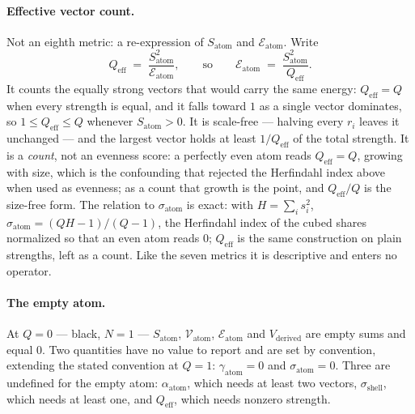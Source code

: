 \documentclass[12pt, a4paper]{article}
\begin{document}
\paragraph{Effective vector count.} Not an eighth metric: a
re-expression of $S_{\text{atom}}$ and $\mathcal{E}_{\text{atom}}$.
Write
\[
    Q_{\mathrm{eff}} \;=\; \frac{S_{\text{atom}}^{2}}{\mathcal{E}_{\text{atom}}},
    \qquad\text{so}\qquad
    \mathcal{E}_{\text{atom}} \;=\; \frac{S_{\text{atom}}^{2}}{Q_{\mathrm{eff}}}.
\]
It counts the equally strong vectors that would carry the same
energy: $Q_{\mathrm{eff}}=Q$ when every strength is equal, and it falls
toward $1$ as a single vector dominates, so $1\le Q_{\mathrm{eff}}\le Q$ whenever $S_{\text{atom}}>0$.
It is scale-free --- halving every $r_i$ leaves it unchanged --- and the
largest vector holds at least $1/Q_{\mathrm{eff}}$ of the total
strength. It is a \emph{count}, not an evenness score: a perfectly
even atom reads $Q_{\mathrm{eff}}=Q$, growing with size, which is the
confounding that rejected the Herfindahl index above when used as
evenness; as a count that growth is the point, and
$Q_{\mathrm{eff}}/Q$ is the size-free form. The relation to
$\sigma_{\text{atom}}$ is exact: with $H=\sum_i s_i^2$,
$\sigma_{\text{atom}}=(QH-1)/(Q-1)$, the Herfindahl index of the cubed
shares normalized so that an even atom reads $0$; $Q_{\mathrm{eff}}$ is
the same construction on plain strengths, left as a count. Like the
seven metrics it is descriptive and enters no operator.

\paragraph{The empty atom.} At $Q=0$ --- black, $N=1$ ---
$S_{\text{atom}}$, $\mathcal{V}_{\text{atom}}$, $\mathcal{E}_{\text{atom}}$
and $V_{\text{derived}}$ are empty sums and equal $0$. Two quantities
have no value to report and are set by convention, extending the stated
convention at $Q=1$: $\gamma_{\text{atom}}=0$ and
$\sigma_{\text{atom}}=0$. Three are undefined for the empty atom:
$\alpha_{\text{atom}}$, which needs at least two vectors,
$\sigma_{\text{shell}}$, which needs at least one, and
$Q_{\mathrm{eff}}$, which needs nonzero strength.
\end{document}
